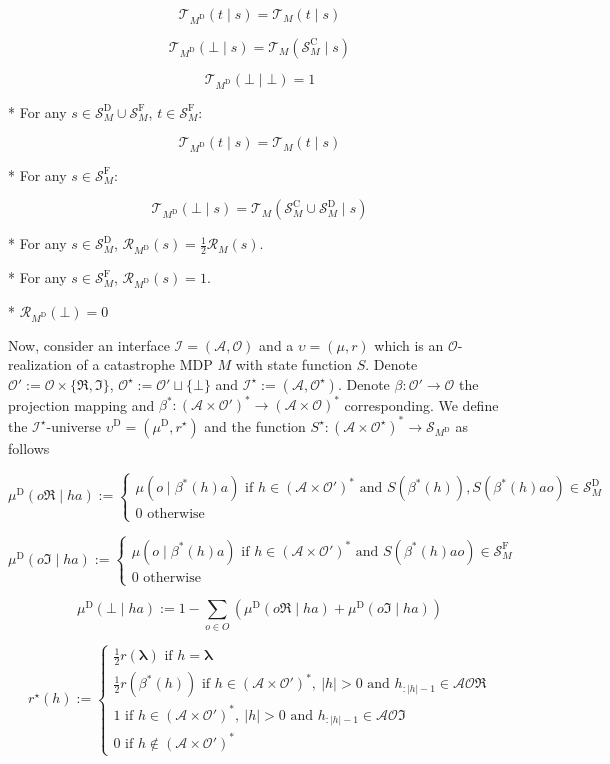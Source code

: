 \documentclass[a4paper]{article}
\newcommand{\AP}[1]{\left(#1\right)}
\newcommand{\Estr}{\boldsymbol{\lambda}}
\newcommand{\Abs}[1]{\left\vert #1 \right\vert}
\newcommand{\Ob}{\mathcal{O}}
\newcommand{\A}{\mathcal{A}}
\newcommand{\St}{\mathcal{S}}
\newcommand{\T}{\mathcal{T}}
\newcommand{\R}{\mathcal{R}}
\newcommand{\In}{\mathcal{I}}
\newcommand{\RMC}{\mathrm{C}}
\newcommand{\RMD}{\mathrm{D}}
\newcommand{\RMF}{\mathrm{F}}
\newcommand{\SF}{\St^{\RMF}}
\newcommand{\SD}{\St^{\RMD}}
\newcommand{\SC}{\St^{\RMC}}
\newcommand{\MD}{M^{\RMD}}
\newcommand{\UD}{\upsilon^{\RMD}}
\begin{document}
$$\T_{\MD}(t \mid s) = \T_M(t \mid s)$$

$$\T_{\MD}(\bot \mid s) = \T_M(\SC_M \mid s)$$

$$\T_{\MD}(\bot \mid \bot) = 1$$

* For any $s \in \SD_M \cup \SF_M$, $t \in \SF_M$:

$$\T_{\MD}(t \mid s) = \T_M(t \mid s)$$

* For any $s \in \SF_M$:

$$\T_{\MD}(\bot \mid s) = \T_M(\SC_M \cup \SD_M \mid s)$$

* For any $s \in \SD_M$, $\R_{\MD}(s) = \frac{1}{2}\R_M(s)$.

* For any $s \in \SF_M$, $\R_{\MD}(s) = 1$.

* $\R_{\MD}(\bot) = 0$

Now, consider an interface $\In=(\A,\Ob)$ and a $\upsilon=(\mu,r)$ which is an $\Ob$-realization of a catastrophe MDP $M$ with state function $S$. Denote $\Ob':=\Ob\times\{\Re,\Im\}$, $\Ob^\star:=\Ob' \sqcup \{\bot\}$ and $\In^\star:=(\A,\Ob^\star)$. Denote $\beta: \Ob' \rightarrow \Ob$ the projection mapping and $\beta^*: \AP{\A \times \Ob'}^* \rightarrow \AP{\A \times \Ob}^*$ corresponding. We define the $\In^\star$-universe $\UD=(\mu^\RMD,r^\star)$ and the function $S^\star: \AP{\A \times \Ob^\star}^* \rightarrow \St_{\MD}$ as follows

$$\mu^\RMD(o\Re \mid ha) := \begin{cases} \mu\AP{o \mid \beta^*(h)a} \text{ if } h\in\AP{\A \times \Ob'}^* \text{ and } S\AP{\beta^*(h)},S\AP{\beta^*(h)ao}\in\SD_M \\ 0 \text{ otherwise} \end{cases}$$

$$\mu^\RMD(o\Im \mid ha) := \begin{cases} \mu\AP{o \mid \beta^*(h)a} \text{ if } h\in\AP{\A \times \Ob'}^* \text{ and } S\AP{\beta^*(h)ao}\in\SF_M \\ 0 \text{ otherwise} \end{cases}$$

$$\mu^\RMD(\bot \mid ha) := 1 - \sum_{o \in O} \AP{\mu^\RMD(o\Re \mid ha) + \mu^\RMD(o\Im \mid ha)}$$

$$r^\star(h):=\begin{cases} \frac{1}{2}r(\Estr) \text{ if } h = \Estr \\ \frac{1}{2}r\AP{\beta^*(h)} \text{ if } h\in\AP{\A \times \Ob'}^*,\ \Abs{h}>0 \text{ and } h_{:\Abs{h}-1}\in\A\Ob\Re \\ 1 \text{ if } h\in\AP{\A \times \Ob'}^*,\ \Abs{h}>0 \text{ and } h_{:\Abs{h}-1}\in\A\Ob\Im \\ 0 \text{ if } h\not\in\AP{\A \times \Ob'}^* \end{cases}$$
\end{document}
